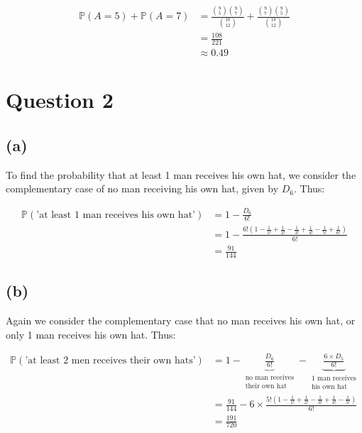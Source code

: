 \documentclass[12pt]{article}
\begin{document}
\begin{align*}
    \mathbb{P}(A = 5) + \mathbb{P}(A = 7) &= \frac{\displaystyle\binom{9}{5}\displaystyle\binom{9}{7}}{\displaystyle\binom{18}{12}} + \frac{\displaystyle\binom{9}{7}\displaystyle\binom{9}{5}}{\displaystyle\binom{18}{12}} \\ 
    &= \frac{108}{221} \\ 
    &\boxed{\approx 0.49}
\end{align*}

\newpage

\section*{Question 2}

\subsection*{(a)}

To find the probability that at least 1 man receives his own hat, we consider the complementary case of no man receiving his own hat, given by $D_6$. Thus:

\begin{align*}
    \mathbb{P}(\text{'at least 1 man receives his own hat'}) &= 1 - \frac{D_{6}}{6!} \\ 
    &= 1 - \frac{6! (1-\frac{1}{1!}+\frac{1}{2!}- \frac{1}{3!}+\frac{1}{4!} - \frac{1}{5!}+\frac{1}{6!})}{6!} \\
    &= \boxed{\frac{91}{144}}
\end{align*}

\subsection*{(b)}

Again we consider the complementary case that no man receives his own hat, or only 1 man receives his own hat. Thus:

\begin{align*}
    \mathbb{P}(\text{'at least 2 men receives their own hats'}) &= 1 - \underbrace{\frac{D_{6}}{6!}}_{\substack{\text{no man receives} \\ \text{their own hat}}} - \underbrace{\frac{6 \times D_{5}}{6!}}_{\substack{\text{1 man receives} \\ \text{his own hat}}} \\ 
    &= \frac{91}{144} - 6 \times \frac{5!(1-\frac{1}{1!}+\frac{1}{2!}-\frac{1}{3!}+\frac{1}{4!}-\frac{1}{5!})}{6!}\\
    &= \boxed{\frac{191}{720}}
\end{align*}
\end{document}
